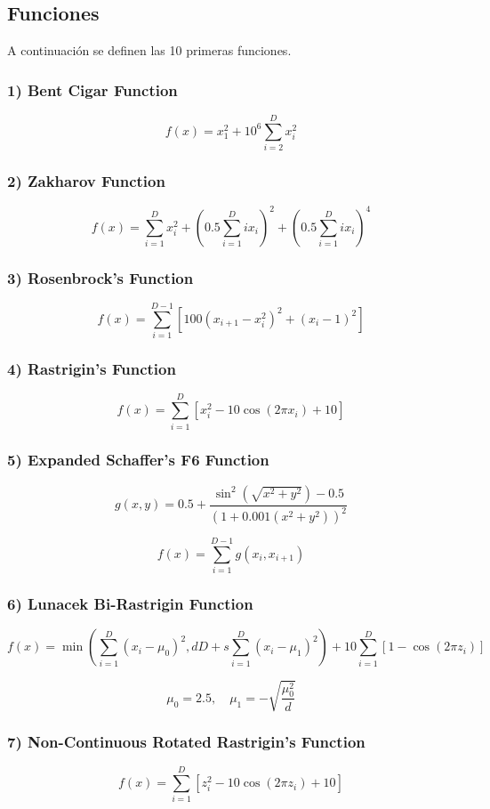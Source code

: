 \documentclass[12pt,twoside]{article}
\begin{document}
	\subsection{Funciones}
	
	A continuación se definen las 10 primeras funciones.
	
	\subsubsection*{1) Bent Cigar Function}
	\[
	f(x) = x_1^2 + 10^6 \sum_{i=2}^{D} x_i^2
	\]
	
	\subsubsection*{2) Zakharov Function}
	\[
	f(x) = \sum_{i=1}^{D} x_i^2 + \left( 0.5 \sum_{i=1}^{D} i x_i \right)^2 + \left( 0.5 \sum_{i=1}^{D} i x_i \right)^4
	\]
	
	\subsubsection*{3) Rosenbrock's Function}
	\[
	f(x) = \sum_{i=1}^{D-1} \left[ 100 (x_{i+1} - x_i^2)^2 + (x_i - 1)^2 \right]
	\]
	
	\subsubsection*{4) Rastrigin's Function}
	\[
	f(x) = \sum_{i=1}^{D} \left[ x_i^2 - 10 \cos(2 \pi x_i) + 10 \right]
	\]
	
	\subsubsection*{5) Expanded Schaffer's F6 Function}
	\[
	g(x, y) = 0.5 + \frac{\sin^2(\sqrt{x^2 + y^2}) - 0.5}{(1 + 0.001(x^2 + y^2))^2}
	\]
	
	\[
	f(x) = \sum_{i=1}^{D-1} g(x_i, x_{i+1})
	\]
	
	\subsubsection*{6) Lunacek Bi-Rastrigin Function}
	\[
	f(x) = \min \left( \sum_{i=1}^{D} (x_i - \mu_0)^2, dD + s \sum_{i=1}^{D} (x_i - \mu_1)^2 \right) 
	+ 10 \sum_{i=1}^{D} \left[ 1 - \cos(2 \pi z_i) \right]
	\]
	
	\[
	\mu_0 = 2.5, \quad \mu_1 = -\sqrt{\frac{\mu_0^2}{d}}
	\]
	
	\subsubsection*{7) Non-Continuous Rotated Rastrigin's Function}
	\[
	f(x) = \sum_{i=1}^{D} \left[ z_i^2 - 10\cos(2\pi z_i) + 10 \right]
	\]
	
\end{document}
